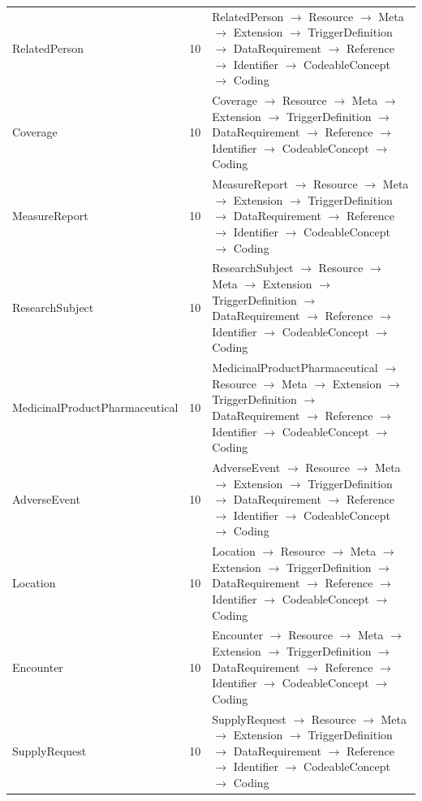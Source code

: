 \begin{longtable}{lrl}
RelatedPerson & 10 & RelatedPerson $\rightarrow$ Resource $\rightarrow$ Meta $\rightarrow$ Extension $\rightarrow$ TriggerDefinition $\rightarrow$ DataRequirement $\rightarrow$ Reference $\rightarrow$ Identifier $\rightarrow$ CodeableConcept $\rightarrow$ Coding \\
Coverage & 10 & Coverage $\rightarrow$ Resource $\rightarrow$ Meta $\rightarrow$ Extension $\rightarrow$ TriggerDefinition $\rightarrow$ DataRequirement $\rightarrow$ Reference $\rightarrow$ Identifier $\rightarrow$ CodeableConcept $\rightarrow$ Coding \\
MeasureReport & 10 & MeasureReport $\rightarrow$ Resource $\rightarrow$ Meta $\rightarrow$ Extension $\rightarrow$ TriggerDefinition $\rightarrow$ DataRequirement $\rightarrow$ Reference $\rightarrow$ Identifier $\rightarrow$ CodeableConcept $\rightarrow$ Coding \\
ResearchSubject & 10 & ResearchSubject $\rightarrow$ Resource $\rightarrow$ Meta $\rightarrow$ Extension $\rightarrow$ TriggerDefinition $\rightarrow$ DataRequirement $\rightarrow$ Reference $\rightarrow$ Identifier $\rightarrow$ CodeableConcept $\rightarrow$ Coding \\
MedicinalProductPharmaceutical & 10 & MedicinalProductPharmaceutical $\rightarrow$ Resource $\rightarrow$ Meta $\rightarrow$ Extension $\rightarrow$ TriggerDefinition $\rightarrow$ DataRequirement $\rightarrow$ Reference $\rightarrow$ Identifier $\rightarrow$ CodeableConcept $\rightarrow$ Coding \\
AdverseEvent & 10 & AdverseEvent $\rightarrow$ Resource $\rightarrow$ Meta $\rightarrow$ Extension $\rightarrow$ TriggerDefinition $\rightarrow$ DataRequirement $\rightarrow$ Reference $\rightarrow$ Identifier $\rightarrow$ CodeableConcept $\rightarrow$ Coding \\
Location & 10 & Location $\rightarrow$ Resource $\rightarrow$ Meta $\rightarrow$ Extension $\rightarrow$ TriggerDefinition $\rightarrow$ DataRequirement $\rightarrow$ Reference $\rightarrow$ Identifier $\rightarrow$ CodeableConcept $\rightarrow$ Coding \\
Encounter & 10 & Encounter $\rightarrow$ Resource $\rightarrow$ Meta $\rightarrow$ Extension $\rightarrow$ TriggerDefinition $\rightarrow$ DataRequirement $\rightarrow$ Reference $\rightarrow$ Identifier $\rightarrow$ CodeableConcept $\rightarrow$ Coding \\
SupplyRequest & 10 & SupplyRequest $\rightarrow$ Resource $\rightarrow$ Meta $\rightarrow$ Extension $\rightarrow$ TriggerDefinition $\rightarrow$ DataRequirement $\rightarrow$ Reference $\rightarrow$ Identifier $\rightarrow$ CodeableConcept $\rightarrow$ Coding \\

\end{longtable}
